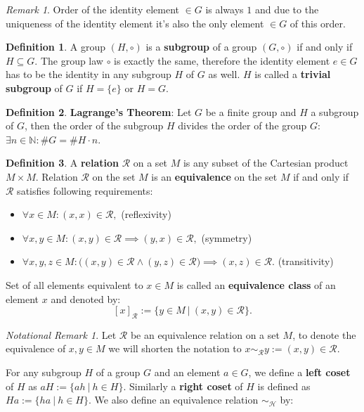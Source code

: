 \documentclass[thesis=M,english]{FITthesis}[2012/10/20]
\theoremstyle{remark}
\newtheorem*{RM}{Remark}
\newtheorem*{NRM}{Notational Remark}
\theoremstyle{definition}
\newtheorem{DF}{Definition}[section]
\begin{document}
\begin{RM}
Order of the identity element $\in G$ is always $1$ and due to the uniqueness of the identity element it's also the only element $\in G$ of this order.
\end{RM}
\begin{DF}
A group $(H, \circ)$ is a \textbf{subgroup} of a group $(G, \circ)$ if and only if $H \subseteq G.$ The group law $\circ$ is exactly the same, therefore the identity element $e \in G$ has to be the identity in any subgroup $H$ of $G$ as well. $H$ is called a \textbf{trivial subgroup} of $G$ if $H = \{e\}$ or $H = G$.
\end{DF}
\begin{DF}
\textbf{Lagrange's Theorem}: Let $G$ be a finite group and $H$ a subgroup of $G$, then the order of the subgroup $H$ divides the order of the group $G$: $\exists n \in \mathbb{N}: \#G = \#H \cdot n.$
\label{lagrange}
\end{DF}
\begin{DF}
A \textbf{relation} $\mathcal{R}$ on a set $M$ is any subset of the Cartesian product $M\times M$. Relation $\mathcal{R}$ on the set $M$ is an \textbf{equivalence} on the set $M$ if and only if $\mathcal{R}$ satisfies following requirements:
\begin{itemize}
\item $\forall	x \in M: (x,x) \in \mathcal{R},$ \hfill (reflexivity)
\item $\forall x,y \in M: (x,y) \in \mathcal{R} \implies (y,x) \in \mathcal{R},$ \hfill (symmetry)
\item $\forall x,y,z \in M: \bigg( (x,y) \in \mathcal{R} \land (y,z) \in \mathcal{R}\bigg) \implies (x,z) \in \mathcal{R}.$ \hfill (transitivity)
\end{itemize}
\end{DF}
\noindent Set of all elements equivalent to $x \in M$ is called an \textbf{equivalence class} of an element $x$ and denoted by:
$$
[x]_\mathcal{R} := \{y \in M \ |\ (x,y) \in \mathcal{R}\}.
$$
\begin{NRM}
Let $\mathcal{R}$ be an equivalence relation on a set $M$, to denote the equivalence of $x,y \in M$ we will shorten the notation to $x \sim_\mathcal{R} y := (x,y) \in \mathcal{R}.$ 
\end{NRM}
\noindent For any subgroup $H$ of a group $G$ and an element $a \in G$, we define a \textbf{left coset} of $H$ as $aH := \{ah\ |\ h \in H\}$. Similarly a \textbf{right coset} of $H$ is defined as $Ha := \{ha\ |\ h \in H\}$.  We also define an equivalence relation $\sim_{\mathcal{H}}$ by: 
\end{document}

